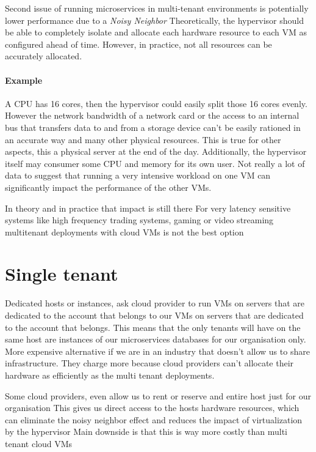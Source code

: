 Second issue of running microservices in multi-tenant environments is potentially lower performance due to a \textit{Noisy Neighbor}
Theoretically, the hypervisor should be able to completely isolate and allocate each hardware resource to each VM as configured ahead of time.
However, in practice, not all resources can be accurately allocated.

\paragraph{Example}
A CPU has 16 cores, then the hypervisor could easily split those 16 cores evenly.
However the network bandwidth of a network card or the access to an internal bus that transfers data to and from a storage device can't be easily rationed in an accurate way and many other physical resources.
This is true for other aspects, this a physical server at the end of the day.
Additionally, the hypervisor itself may consumer some CPU and memory for its own user.
Not really a lot of data to suggest that running a very intensive workload on one VM can significantly impact the performance of the other VMs.

In theory and in practice that impact is still there
For very latency sensitive systems like high frequency trading systems, gaming or video streaming multitenant deployments with cloud VMs is not the best option


\section{Single tenant}
Dedicated hosts or instances, ask cloud provider to run VMs on servers that are dedicated to the account that belongs to our VMs on servers that are dedicated to the account that belongs.
This means that the only tenants will have on the same host are instances of our microservices databases for our organisation only.
More expensive alternative if we are in an industry that doesn't allow us to share infrastructure.
They charge more because cloud providers can't allocate their hardware as efficiently as the multi tenant deployments.

Some cloud providers, even allow us to rent or reserve and entire host just for our organisation
This gives us direct access to the hosts hardware resources, which can eliminate the noisy neighbor effect and reduces the impact of virtualization by the hypervisor
Main downside is that this is way more costly than multi tenant cloud VMs


